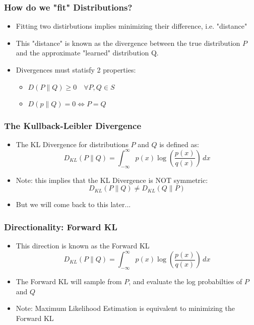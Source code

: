 \documentclass{beamer}
\begin{document}
\begin{frame}
  \frametitle{How do we "fit" Distributions?}
  \begin{itemize}
    \item Fitting two distirbutions implies minimizing their difference,
      i.e. "distance"
    \item This "distance" is known as the divergence between the true distribution
    $P$ and the approximate "learned" distribution Q.
    \pause
    \item Divergences must statisfy 2 properties:
    \begin{itemize}
      \item $D(P \parallel Q ) \geq 0 \quad \forall P, Q \in S$
      \item $D(p \parallel Q ) = 0 \iff P = Q$
    \end{itemize}
  \end{itemize}

\end{frame}

\begin{frame}
  \frametitle{The Kullback-Leibler Divergence}
  \begin{itemize}
    \item The KL Divergence for distributions $P$ and $Q$ is defined as:
    \begin{equation*}
      D_{KL} (P \parallel Q) = \int_{-\infty}^{\infty} p(x)\log \left({\frac {p(x)}{q(x)}}\right)\,dx
    \end{equation*}
    \pause
    \item Note: this implies that the KL Divergence is NOT symmetric:
    \begin{equation*}
      D_{KL} (P \parallel Q) \not= D_{KL} (Q \parallel P)
    \end{equation*}
    \item But we will come back to this later...
  \end{itemize}
\end{frame}


\begin{frame}
  \frametitle{Directionality: Forward KL}
  \begin{itemize}
    \item This direction is known as the Forward KL
    \begin{equation*}
      D_{KL} (P \parallel Q) = \int_{-\infty}^{\infty} p(x)\log \left({\frac {p(x)}{q(x)}}\right)\,dx
    \end{equation*}
    \pause
    \item The Forward KL will sample from $P$, and evaluate the log probabilties of $P$ and $Q$
    \pause
    \item Note: Maximum Likelihood Estimation is equivalent to minimizing the Forward KL
  \end{itemize}
\end{frame}
\end{document}
